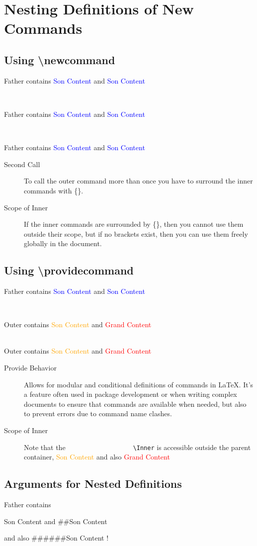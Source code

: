 \documentclass{article}
\begin{document}
	\pagebreak
	
	\section{Nesting Definitions of New Commands}
	
	\subsection{Using \textbackslash newcommand}
	\newcommand{\Father}{
		{%
		\newcommand{\Son}{
				\textcolor{blue}{Son Content}		
			}	
		Father contains \Son and \Son
		}%
	}
	\Father \\
	\Father \\
	\Father
	
	\begin{description}
		\item[Second Call] To call the outer command 					more than once you have to surround the 					inner commands with \{\}.
		\item[Scope of Inner] If the inner commands are 				surrounded by \{\}, then you cannot use them 			outside their scope, but if no brackets 					exist, then you can use them freely globally 			in the document.
	\end{description}
	
	\subsection{Using \textbackslash providecommand}
	\providecommand{\Father}{\textbf{Text}}
	\Father
	
	\noindent\\[5pt]
	\newcommand{\Outer}{
		\providecommand{\Inner}{
			\textcolor{orange}{Son Content}	
			\providecommand{\Inside}{
				\textcolor{red}{Grand Content}			
			}	
		}
		Outer contains \Inner and \Inside
	}
	\Outer \\
	\Outer
	
	\begin{description}
		\item[Provide Behavior] Allows for modular and 				conditional definitions of commands in \LaTeX. 				It's a feature often used in package development 		or when writing complex documents to ensure that 		commands are available when needed, but also to 			prevent errors due to command name clashes.
		\item[Scope of Inner] Note that the\verb|					\Inner| is accessible outside the parent 					container, \Inner and also \Inside
	\end{description}
	
	\subsection{Arguments for Nested Definitions}
	\newcommand{\father}[1]{
		\providecommand{\son}[1]{
			\textcolor{green!80}{##1}
			\providecommand{\grand}[1]{
				\textcolor{teal!80}{####1}	
				\providecommand{\fourth}[1]{
					\textcolor{orange!80}{########1}		
				}	
			}
		}
		\textcolor{red!80}{#1} contains 
			\son{Son Content} and \grand{Grand Content}
			and also \fourth{Fourth Level}!
	}
	\father{Father}
\end{document}
